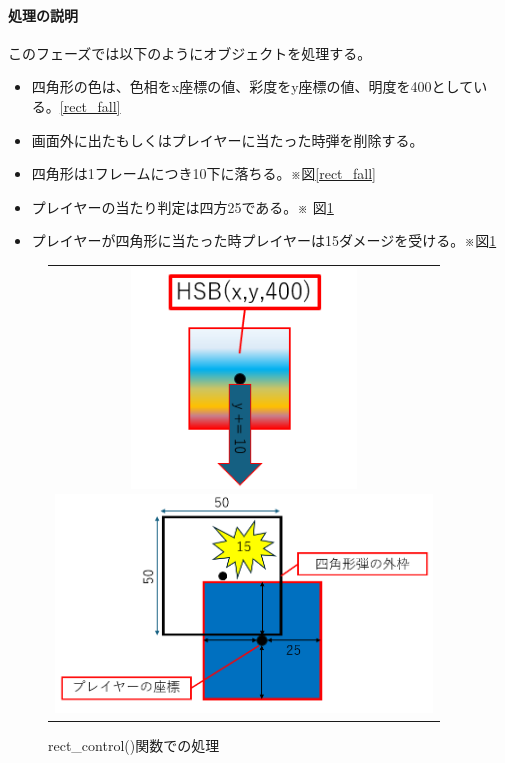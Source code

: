 \documentclass[a4paper,titlepage,11pt]{ltjsarticle}
\begin{document}
\paragraph{処理の説明}
このフェーズでは以下のようにオブジェクトを処理する。
\begin{itemize}
	\item 四角形の色は、色相をx座標の値、彩度をy座標の値、明度を400としている。\ref{rect_fall}
	\item 画面外に出たもしくはプレイヤーに当たった時弾を削除する。
	\item 四角形は1フレームにつき10下に落ちる。※図\ref{rect_fall}
	\item プレイヤーの当たり判定は四方25である。※	図\ref{rect_attack}
	\item プレイヤーが四角形に当たった時プレイヤーは15ダメージを受ける。※図\ref{rect_attack}
\end{itemize}
\begin{figure}[H]
\begin{center}
\begin{tabular}{c}
\begin{minipage}{0.5\hsize}
\begin{center}
\includegraphics[width=6cm]{rect_fall.png}
\end{center}
\caption{rect\_fall()関数での処理}
\label{rect_fall}
\end{minipage}
\begin{minipage}{0.5\hsize}
\begin{center}
\includegraphics[width=10cm]{control_rect.png}
\end{center}
\caption{rect\_control()関数での処理}
\label{rect_attack}
\end{minipage}
\end{tabular}
\end{center}
\end{figure}
\end{document}
